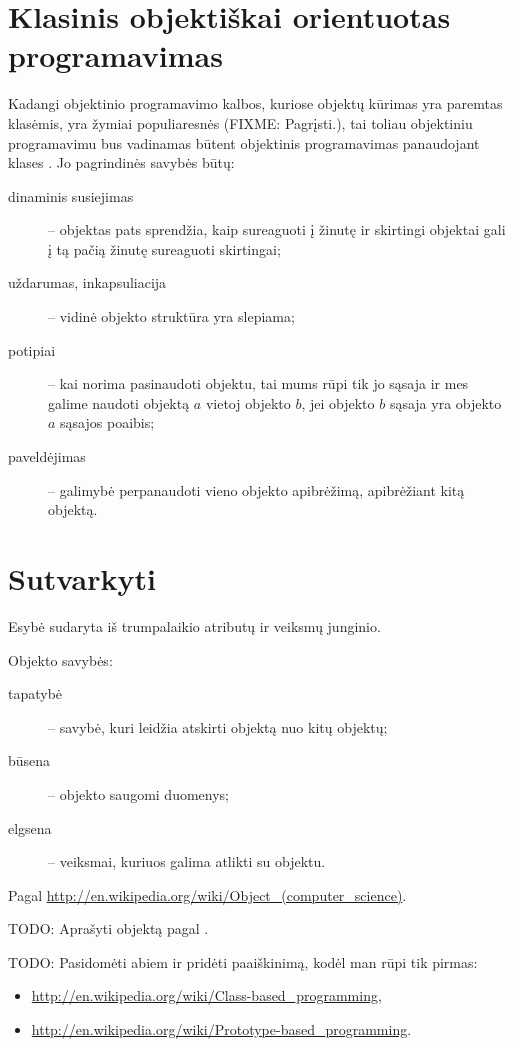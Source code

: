 \section{Klasinis objektiškai orientuotas programavimas}

Kadangi objektinio programavimo kalbos, kuriose objektų kūrimas yra
paremtas klasėmis, yra žymiai populiaresnės (FIXME: Pagrįsti.), tai
toliau objektiniu programavimu bus vadinamas būtent objektinis
programavimas panaudojant klases . Jo
pagrindinės savybės būtų:
\begin{description}
  \item[dinaminis susiejimas] – objektas pats sprendžia, kaip sureaguoti
    į žinutę ir skirtingi objektai gali į tą pačią žinutę sureaguoti
    skirtingai;
  \item[uždarumas, inkapsuliacija] – vidinė objekto struktūra yra
    slepiama;
  \item[potipiai] – kai norima pasinaudoti objektu, tai mums rūpi tik
    jo sąsaja ir mes galime naudoti objektą $a$ vietoj objekto $b$,
    jei objekto $b$ sąsaja yra objekto $a$ sąsajos poaibis;
  \item[paveldėjimas] – galimybė perpanaudoti vieno objekto apibrėžimą,
    apibrėžiant kitą objektą.
\end{description}

\section{Sutvarkyti}

\begin{defn}[Objektas]
  Esybė sudaryta iš trumpalaikio atributų ir veiksmų junginio.

  Objekto savybės:
  \begin{description}
    \item[tapatybė] – savybė, kuri leidžia atskirti objektą nuo kitų
      objektų;
    \item[būsena] – objekto saugomi duomenys;
    \item[elgsena] – veiksmai, kuriuos galima atlikti su objektu.
  \end{description}

  Pagal \url{http://en.wikipedia.org/wiki/Object_(computer_science)}.

  TODO: Aprašyti objektą pagal \cite[38]{Booch:2007:OAD:1407387}.
\end{defn}

TODO: Pasidomėti abiem ir pridėti paaiškinimą, kodėl man rūpi tik pirmas:
\begin{itemize}
  \item \url{http://en.wikipedia.org/wiki/Class-based_programming},
  \item \url{http://en.wikipedia.org/wiki/Prototype-based_programming}.
\end{itemize}

